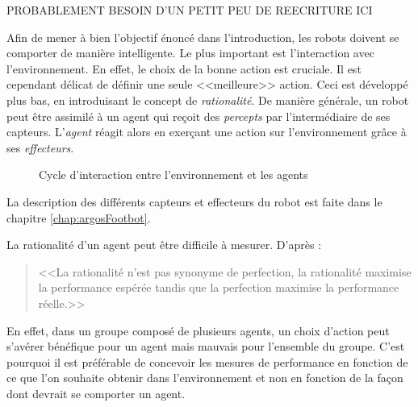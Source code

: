 PROBABLEMENT BESOIN D'UN PETIT PEU DE REECRITURE ICI

Afin de mener à bien l'objectif énoncé dans l'introduction, les robots doivent se comporter de manière intelligente. Le plus important est l'interaction avec l'environnement. En effet, le choix de la bonne action est cruciale. Il est cependant délicat de définir une seule <<meilleure>> action. Ceci est développé plus bas, en introduisant le concept de \emph{rationalité}.
De manière générale, un robot peut être assimilé à un agent qui reçoit des \emph{percepts} par l'intermédiaire de ses capteurs. L'\emph{agent} réagit alors en exerçant une action sur l'environnement grâce à ses \emph{effecteurs}.
\begin{figure}[htb]
\centering
{}
    \caption{Cycle d'interaction entre l'environnement et les agents}
\end{figure}
La description des différents capteurs et effecteurs du robot est faite dans le chapitre \ref{chap:argosFootbot}.

La rationalité d'un agent peut être difficile à mesurer. D'après \cite{AIBrique}:
\begin{quote}
  <<La rationalité n'est pas synonyme de perfection, la rationalité maximise la performance espérée tandis que la perfection maximise la performance réelle.>>
\end{quote}


En effet, dans un groupe composé de plusieurs agents, un choix d'action peut s'avérer bénéfique pour un agent mais mauvais pour l'ensemble du groupe. C'est pourquoi il est préférable de concevoir les mesures de performance en fonction de ce que l'on souhaite obtenir dans l'environnement et non en fonction de la façon dont devrait se comporter un agent.

